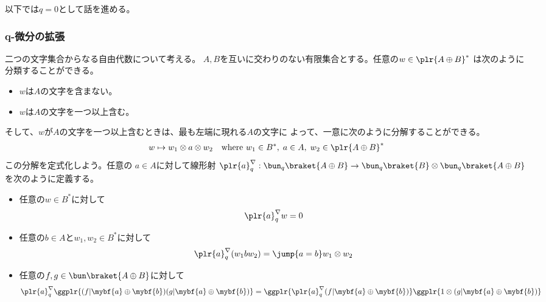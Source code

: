 {	以下では$q=0$として話を進める。



\subsubsection{q-微分の拡張}\label{s3:q-微分の拡張} %
	二つの文字集合からなる自由代数について考える。
	$A,B$を互いに交わりのない有限集合とする。任意の$w\in\plr{A\oplus B}^*$
	は次のように分類することができる。
	\begin{itemize}\setlength{\itemsep}{-1mm} %
		\item $w$は$A$の文字を含まない。
		\item $w$は$A$の文字を一つ以上含む。
	\end{itemize} %
	そして、$w$が$A$の文字を一つ以上含むときは、最も左端に現れる$A$の文字に
	よって、一意に次のように分解することができる。
	\begin{equation*}\begin{split}
		w \mapsto w_1\otimes a\otimes w_2 
		\quad\text{where } w_1\in B^*,\; a\in A,\; w_2\in \plr{A\oplus B}^*
	\end{split}\end{equation*}
	この分解を定式化しよう。任意の $a\in A$に対して線形射
	$\plr{a}^\nabla_q:\bun_q\braket{A\oplus B}
	\to\bun_q\braket{B}\otimes\bun_q\braket{A\oplus B}$を次のように定義する。
	\begin{itemize}\setlength{\itemsep}{-1mm} %
		\item 任意の$w\in B^*$に対して
		\begin{equation*}\begin{split}
			\plr{a}_q^\nabla w = 0
		\end{split}\end{equation*}
		\item 任意の$b\in A$と$w_1,w_2\in B^*$に対して
		\begin{equation*}\begin{split}
			\plr{a}_q^\nabla (w_1bw_2) = \jump{a=b} w_1\otimes w_2
		\end{split}\end{equation*}
		\item 任意の$f,g\in\bun\braket{A\oplus B}$に対して
		\begin{equation*}\begin{split}
			\plr{a}^\nabla_q \ggplr{(f|\mybf{a}\oplus\mybf{b})
			(g|\mybf{a}\oplus\mybf{b})}
			&= \ggplr{\plr{a}^\nabla_q (f|\mybf{a}\oplus\mybf{b})}
				\ggplr{1\otimes(g|\mybf{a}\oplus\mybf{b})} \\

\end{split}
\end{equation*}
\end{itemize}}
